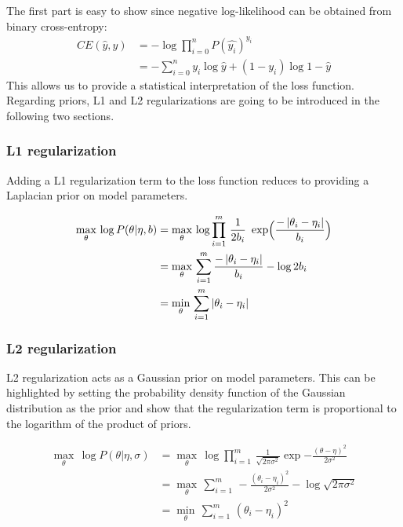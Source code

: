 	The first part is easy to show since negative log-likelihood can be obtained from binary cross-entropy:
	\begin{align}
		CE(\hat{y}, y) & = - \log{\prod\limits_{i=0}^n P(\hat{y_i})^{y_i}}  \\
		& = -\sum\limits_{i=0}^n y_i \log{\hat{y}} + (1 - y_i) \log{1 - \hat{y}}
	\end{align}
	This allows us to provide a statistical interpretation of the loss function.
	Regarding priors, L1 and L2 regularizations are going to be introduced in the following two sections.

	\subsubsection{L1 regularization}

	   Adding a L1 regularization term to the loss function reduces to providing a Laplacian
	   prior on model parameters.  

	   \begin{align}
	       \max_{\theta}\, \log{P(\theta \vert \eta, b)} 
		   & = \max_{\theta}\, \log{\prod\limits_{i=1}^m \, \frac{1}{2b_i}\,
		   \text{ exp}\Big(\frac{- \left|\theta_i - \eta_i\right|}{b_i}\Big)} \\
		   & = \max_{\theta}\, \sum\limits_{i=1}^m \frac{- \left|\theta_i - \eta_i\right|}{b_i} - \log{2b_i} \\
		   & = \min_{\theta}\, \sum\limits_{i=1}^m \left|\theta_i - \eta_i\right|
	   \end{align}

	\subsubsection{L2 regularization}
		   
	   L2 regularization acts as a Gaussian prior on model parameters.
	   This can be highlighted by setting the probability density function of the Gaussian
	   distribution as the prior and show that the regularization term is proportional
	   to the logarithm of the product of priors.

	   \begin{align}
               \max_{\theta}\, \log{P(\theta \vert \eta, \sigma)}
		   & = \max_{\theta}\, \log{\prod\limits_{i=1}^m \, \frac{1}{\sqrt{2\pi\sigma^2}} 
		   \exp{-\frac{(\theta - \eta)^2}{2\sigma^2}}} \\
		   & = \max_{\theta}\, \sum\limits_{i=1}^m \, -\frac{(\theta_i - \eta_i)^2}{2\sigma^2}
		   - \log{\sqrt{2\pi\sigma^2}} \\
		   & = \min_{\theta}\, \sum\limits_{i=1}^m \, (\theta_i - \eta_i)^2 
           \end{align}

